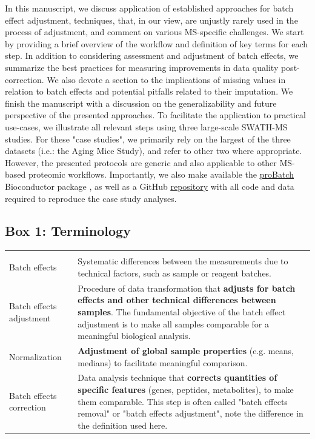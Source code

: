\documentclass[num-refs]{wiley-article}
\begin{document}
In this manuscript, we discuss application of established approaches for batch effect adjustment, techniques, that, in our view, are unjustly rarely used in the process of adjustment, and comment on various MS-specific challenges. We start by providing a brief overview of the workflow and definition of key terms for each step. In addition to considering assessment and adjustment of batch effects, we summarize the best practices for measuring improvements in data quality post-correction. We also devote a section to the implications of missing values in relation to batch effects and potential pitfalls related to their imputation. We finish the manuscript with a discussion on the generalizability and future perspective of the presented approaches. To facilitate the application to practical use-cases, we illustrate all relevant steps using three large-scale SWATH-MS studies. For these "case studies", we primarily rely on the largest of the three datasets (i.e.: the Aging Mice Study), and refer to other two where appropriate. However, the presented protocols are generic and also applicable to other MS-based proteomic workflows. Importantly, we also make available the \underline{\href{https://bioconductor.org/packages/release/bioc/html/proBatch.html}{proBatch}} Bioconductor package , as well as a GitHub  \underline{\href{https://github.com/symbioticMe/batch_effects_workflow_code}{repository}} with all code and data required to reproduce the case study analyses.


\begin{table}[ht]
\begin{tcolorbox}
	\section*{Box 1: Terminology}
	\label{box:Box1_definitions}
	\begin{tabular}{>{\raggedright}p{2cm}m{10.5cm}}
		\headrow
		\thead{Term} & \thead{Definition} \\
		Batch effects & Systematic differences between the measurements due to technical factors, such as sample or reagent batches.  \\
		Batch effects adjustment & Procedure of data transformation that \textbf{adjusts for batch effects and other technical differences between samples}. The fundamental objective of the batch effect adjustment is to make all samples comparable for a meaningful biological analysis. \\
		Normalization & \textbf{Adjustment of global sample properties} (e.g. means, medians) to facilitate meaningful comparison. \\
		Batch effects correction & Data analysis technique that \textbf{corrects quantities of specific features} (genes, peptides, metabolites), to make them comparable. This step is often called "batch effects removal" or "batch effects adjustment", note the difference in the definition used here. \\
		\hline  %
	\end{tabular}
	
\end{tcolorbox}
\end{table}
\end{document}
